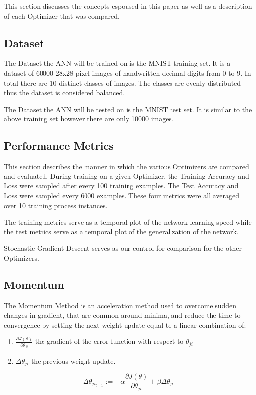 \documentclass{article}
\begin{document}
This section discusses the concepts espoused in this paper as well as a description of each Optimizer that was compared.
  


\subsection{Dataset}

The Dataset the ANN will be trained on is the MNIST training set. It is a dataset of 60000 28x28 pixel images of handwritten decimal digits  from 0 to 9. In total there are 10 distinct classes of images. The classes are evenly distributed thus the dataset is considered balanced.

The Dataset the ANN will be tested on is the MNIST test set. It is similar to the above training set however there are only 10000 images.

\subsection{Performance Metrics}
This section describes the manner in which the various Optimizers are compared and evaluated.
\hfill\newline
During training on a given Optimizer, the Training Accuracy and Loss were sampled after every 100 training examples. The Test Accuracy and Loss were sampled every 6000 examples. These four metrics were all averaged over 10 training process instances. 

The training metrics serve as a temporal plot of the network learning speed while the test metrics serve as a temporal plot of the generalization of the network.

Stochastic Gradient Descent serves as our control for comparison for the other Optimizers.
\subsection{Momentum}
The Momentum Method is an acceleration method \cite{backpropagationOriginal} used to overcome sudden changes in gradient, that are common around minima, and reduce the time to convergence by setting the next weight update equal to a linear combination of:
\begin{enumerate}
	\item $\frac{\partial{J}(\theta)}{\partial{\theta_{ji}}}$ the gradient of the error function with respect to $\theta_{ji}$
	\item $\Delta\theta_{ji}$ the previous weight update.
\end{enumerate}  
\begin{equation}
\Delta\theta_{ji_{t+1}} := -\alpha\frac{\partial{J}(\theta)}{\partial{\theta_{ji}}} + \beta\Delta\theta_{ji}
\end{equation}
\end{document}
